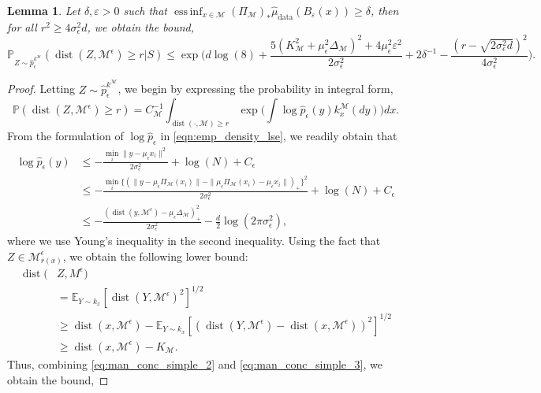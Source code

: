 \documentclass[10pt]{article}
\theoremstyle{plain}
\newtheorem{lemma}[theorem]{Lemma}
\theoremstyle{definition}
\theoremstyle{remark}
\newcommand{\M}{{\mathcal{M}}}
\newcommand{\E}{\mathbb{E}}
\newcommand{\prob}{\mathbb{P}}
\DeclareMathOperator*{\essinf}{ess\,inf}
\newcommand{\hmud}{\hat{\mu}_{\operatorname{data}}}
\newcommand{\dist}{\operatorname{dist}}
\newcommand{\gap}{\Delta_\M}
\begin{document}
\begin{lemma}\label{lem:man_conc_simple}
Let \(\delta, \varepsilon > 0\) such that \(\essinf_{x \in \M} (\Pi_{\M})_* \hmud(B_\varepsilon(x)) \geq \delta\), then for all \(r^2 \geq 4 \sigma_\epsilon^2 d\), we obtain the bound,
\begin{equation*}
    \prob_{Z \sim \hat{p}_\epsilon^{k^\M}}(\dist(Z, \M^\epsilon) \geq r|S) \leq \exp \bigg ( d\log(8) + \frac{5(K_\M^2 + \mu_\epsilon^2 \gap)^2 + 4\mu_\epsilon^2\varepsilon^2}{2\sigma_\epsilon^2} + 2 \delta^{-1} - \frac{(r - \sqrt{2\sigma_\epsilon^2 d})^2}{4 \sigma_\epsilon^2} \bigg ).
\end{equation*}
\end{lemma}
\begin{proof}
Letting \(Z \sim \hat{p}_\epsilon^{k^\M}\), we begin by expressing the probability in integral form,
\begin{equation*}
    \prob(\dist(Z, \M^\epsilon) \geq r) = C_\M^{-1} \int_{\dist(\cdot, \M) \geq r} \exp \bigg ( \int \log \hat{p}_\epsilon(y) k_x^\M(dy) \bigg ) dx.
\end{equation*}
From the formulation of \(\log \hat{p}_\epsilon\) in \eqref{eqn:emp_density_lse}, we readily obtain that
\begin{align}
    \log \hat{p}_\epsilon(y) &\leq -\frac{\min_i \|y - \mu_\epsilon x_i\|^2}{2 \sigma_\epsilon^2} + \log(N) + C_\epsilon \nonumber \\
    &\leq -\frac{\min_i \{ (\|y - \mu_\epsilon \Pi_\M(x_i)\| - \|\mu_\epsilon \Pi_\M(x_i) - \mu_\epsilon x_i\|)_+\}^2}{2 \sigma_\epsilon^2} + \log(N) + C_\epsilon \nonumber\\
    &\leq - \frac{(\dist(y, \M^\epsilon) - \mu_\epsilon \gap)_+^2}{2 \sigma_\epsilon^2} - \frac{d}{2}\log(2 \pi \sigma_\epsilon^2),\label{eq:man_conc_simple_2}
\end{align}
where we use Young's inequality in the second inequality. Using the fact that \(Z \in \M^\epsilon_{r(x)}\), we obtain the following lower bound:
\begin{align}
    \dist(&Z, M^\epsilon) \nonumber\\
    &= \E_{Y \sim k_x}[\dist(Y, \M^\epsilon)^2]^{1/2} \nonumber\\
    &\geq \dist(x, \M^\epsilon) - \E_{Y \sim k_x}[(\dist(Y, \M^\epsilon) - \dist(x, \M^\epsilon))^2]^{1/2} \nonumber\\
    &\geq \dist(x, \M^\epsilon) - K_\M.\label{eq:man_conc_simple_3}
\end{align}
Thus, combining \eqref{eq:man_conc_simple_2} and \eqref{eq:man_conc_simple_3}, we obtain the bound,

\end{proof}
\end{document}
